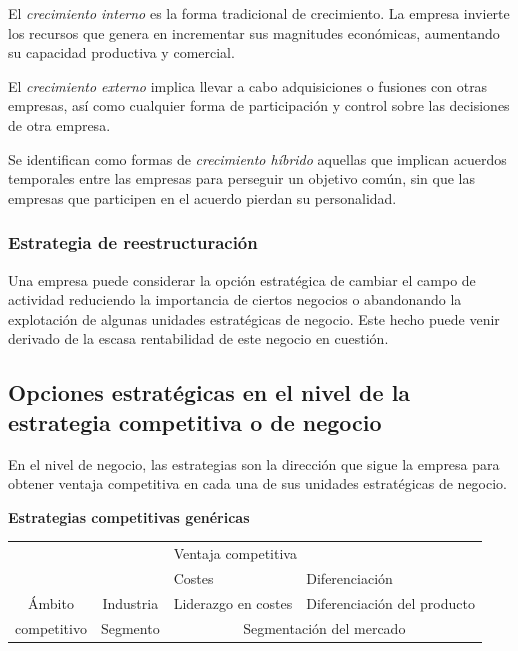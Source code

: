 \documentclass[10pt,a4paper,spanish]{report}
\begin{document}
                        El \textit{\textcolor[rgb]{0.4,0.9,0.6}{crecimiento interno}} es la forma tradicional de crecimiento. La empresa invierte los recursos que genera en incrementar sus magnitudes económicas, aumentando su capacidad productiva y comercial.

                        El \textit{\textcolor[rgb]{0.4,0.9,0.6}{crecimiento externo}} implica llevar a cabo adquisiciones o fusiones con otras empresas, así como cualquier forma de participación y control sobre las decisiones de otra empresa.

                        Se identifican como formas de \textit{\textcolor[rgb]{0.4,0.9,0.6}{crecimiento híbrido}} aquellas que implican acuerdos temporales entre las empresas para perseguir un objetivo común, sin que las empresas que participen en el acuerdo pierdan su personalidad.

                  \subsubsection{\textcolor[rgb]{0.4,0.9,0.6}Estrategia de reestructuración}

                  Una empresa puede considerar la opción estratégica de cambiar el campo de actividad reduciendo la importancia de ciertos negocios o abandonando la explotación de algunas unidades estratégicas de negocio. Este hecho puede venir derivado de la escasa rentabilidad de este negocio en cuestión.

            \subsection{\textcolor[rgb]{0.4,0.9,0.6}Opciones estratégicas en el nivel de la estrategia competitiva o de negocio}

                  En el nivel de negocio, las estrategias son la dirección que sigue la empresa para obtener ventaja competitiva en cada una de sus unidades estratégicas de negocio.

                  \begin{center}
                  \textbf{Estrategias competitivas genéricas}
                  \begin{tabular}{c c|p{3cm}|p{3cm}|}
                  \cline{3-4}
                  & &\multicolumn{2}{|l|}{\cellcolor[rgb]{0.4,0.9,0.6}Ventaja competitiva} \\
                  \cline{3-4}
                  & &\cellcolor[rgb]{0.4,0.9,0.6}Costes &\cellcolor[rgb]{0.4,0.9,0.6} Diferenciación \\
                  \hline
                  \cellcolor[rgb]{0.4,0.9,0.6}Ámbito & \cellcolor[rgb]{0.4,0.9,0.6}Industria & Liderazgo en costes & Diferenciación del producto \\
                  \cline{2-4}
                  \cellcolor[rgb]{0.4,0.9,0.6}competitivo & \cellcolor[rgb]{0.4,0.9,0.6}Segmento & \multicolumn{2}{|c|}{Segmentación del mercado} \\
                  \hline
                  \end{tabular}
                  \end{center}
\end{document}
